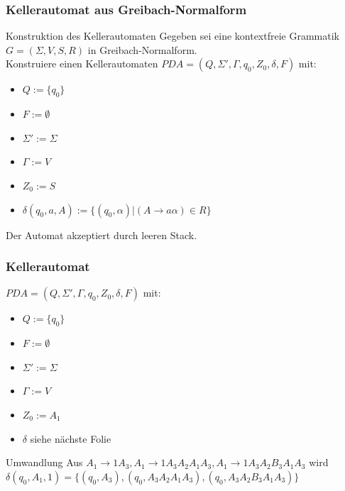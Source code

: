 \begin{frame}
 \frametitle{Kellerautomat aus Greibach-Normalform}
 \begin{block}{Konstruktion des Kellerautomaten}
 Gegeben sei eine kontextfreie Grammatik \(G = (\Sigma, V, S, R)\) in Greibach-Normalform.\\
 Konstruiere einen Kellerautomaten \(PDA = (Q, \Sigma', \Gamma, q_0, Z_0, \delta, F)\) mit:
 \begin{itemize}
  \item $Q := \{q_0\}$
  \item $F := \emptyset$
  \item $\Sigma' := \Sigma$
  \item $\Gamma := V$
  \item $Z_0 := S$
  \item $\delta(q_0, a, A) :=  \{(q_0,\alpha) | (A \rightarrow a \alpha) \in R \}$
 \end{itemize}
 \end{block}
 \pause
 Der Automat akzeptiert durch leeren Stack.
\end{frame}

\begin{frame}
 \frametitle{Kellerautomat}
\(PDA = (Q, \Sigma', \Gamma, q_0, Z_0, \delta, F)\) mit:
 \begin{itemize}
  \item $Q := \{q_0\}$
  \item $F := \emptyset$
  \item $\Sigma' := \Sigma$
  \item $\Gamma := V$
  \item $Z_0 := A_1$
  \item $\delta$ siehe nächste Folie
 \end{itemize}
 \begin{block}{Umwandlung}
 Aus \(A_1 \rightarrow 1A_3, A_1 \rightarrow 1A_3A_2A_1A_3, A_1 \rightarrow 1A_3A_2B_3A_1A_3\)
 wird \(\delta(q_0, A_1, 1) = \{(q_0, A_3), (q_0, A_3A_2A_1A_3), (q_0, A_3A_2B_3A_1A_3) \}\)
 \end{block}
\end{frame}

